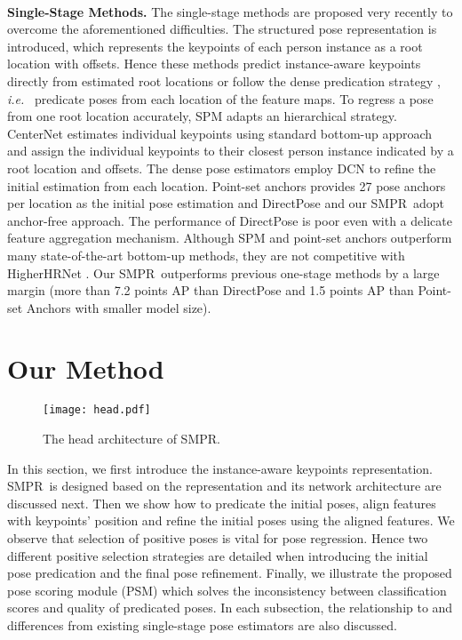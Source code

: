 \documentclass[11pt,twocolumn,journal]{IEEEtran}
\newcommand{\ie}{\emph{i.e.} }
\newcommand{\SMPR}{SMPR}
\begin{document}
\hspace*{\fill} \\
\noindent \textbf{Single-Stage Methods.} \quad 
The single-stage methods \cite{spm19, centernet19, directpose19, pointset20} are proposed very recently to overcome the aforementioned difficulties. The structured pose representation is introduced, which represents the keypoints of each person instance as a root location with  offsets. Hence these methods predict instance-aware keypoints directly from estimated root locations \cite{spm19, centernet19} or follow the dense predication strategy \cite{directpose19, pointset20}, \ie~predicate poses from each location of the feature maps.
To regress a pose from one root location accurately, SPM \cite{spm19} adapts an hierarchical strategy. CenterNet \cite{centernet19} estimates individual keypoints using standard bottom-up approach and assign the individual keypoints to their closest person instance indicated by a root location and  offsets. 
The dense pose estimators \cite{directpose19, pointset20} employ DCN \cite{dcn17} to refine the initial estimation from each location. Point-set anchors \cite{pointset20} provides 27 pose anchors per location as the initial pose estimation and DirectPose \cite{directpose19} and our \SMPR~adopt anchor-free approach. The performance of DirectPose is poor even with a delicate feature aggregation mechanism. Although SPM and point-set anchors outperform many state-of-the-art bottom-up methods, they are not competitive with HigherHRNet \cite{higherhrnet2020}. 
Our \SMPR~outperforms previous one-stage methods by a large margin (more than 7.2 points AP than DirectPose and 1.5 points AP than Point-set Anchors with smaller model size). 




\section{Our Method}
\begin{figure}[H]
\texttt{[image: head.pdf]}
\caption{The head architecture of \SMPR.}
\label{fig_head}
\end{figure}

In this section, we first introduce the instance-aware keypoints representation. \SMPR~is designed based on the representation and its network architecture are discussed next.
Then we show how to predicate the initial poses, align features with keypoints' position and refine the initial poses using the aligned features. We observe that selection of positive poses is vital for pose regression. Hence two different positive selection strategies are detailed when introducing the initial pose predication and the final pose refinement. 
Finally, we illustrate the proposed pose scoring module (PSM) which solves the inconsistency between classification scores and quality of predicated poses. In each subsection, the relationship to and differences from existing single-stage pose estimators are also discussed.
\end{document}
